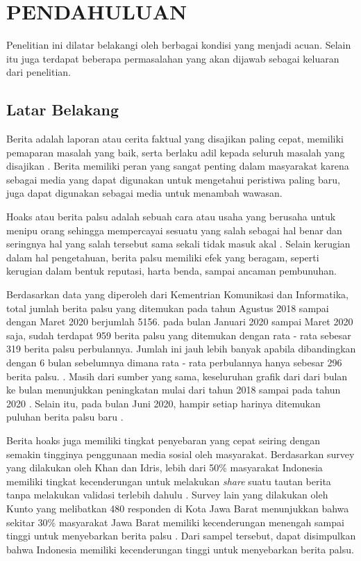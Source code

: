 \chapter{PENDAHULUAN}
\label{chap:pendahuluan}


Penelitian ini dilatar belakangi oleh berbagai kondisi yang menjadi acuan. Selain itu juga terdapat beberapa permasalahan yang akan dijawab sebagai keluaran dari penelitian.

\section{Latar Belakang}
\label{sec:latarbelakang}

Berita adalah laporan atau cerita faktual yang disajikan paling cepat, memiliki pemaparan masalah yang baik, serta berlaku adil kepada seluruh masalah yang disajikan \cite{rani2013persepsi}. Berita memiliki peran yang sangat penting dalam masyarakat karena sebagai media yang dapat digunakan untuk mengetahui peristiwa paling baru, juga dapat digunakan sebagai media untuk menambah wawasan.

Hoaks atau berita palsu adalah sebuah cara atau usaha yang berusaha untuk menipu orang sehingga mempercayai sesuatu yang salah sebagai hal benar dan seringnya hal yang salah tersebut sama sekali tidak masuk akal \cite{berita_bohong}. Selain kerugian dalam hal pengetahuan, berita palsu memiliki efek yang beragam, seperti kerugian dalam bentuk reputasi, harta benda, sampai ancaman pembunuhan.

Berdasarkan data yang diperoleh dari Kementrian Komunikasi dan Informatika, total jumlah berita palsu yang ditemukan pada tahun Agustus 2018 sampai dengan Maret 2020 berjumlah 5156. pada bulan Januari 2020 sampai Maret 2020 saja, sudah terdapat 959 berita palsu yang ditemukan dengan rata - rata sebesar 319 berita palsu perbulannya. Jumlah ini jauh lebih banyak apabila dibandingkan dengan 6 bulan sebelumnya dimana rata - rata perbulannya hanya sebesar 296 berita palsu. \cite{kominfoStatHoax}. Masih dari sumber yang sama, keseluruhan grafik dari dari bulan ke bulan menunjukkan peningkatan mulai dari tahun 2018 sampai pada tahun 2020 \cite{kominfoStatHoax}. Selain itu, pada bulan Juni 2020, hampir setiap harinya ditemukan puluhan berita palsu baru \cite{kominfoJuni2020}.

Berita hoaks juga memiliki tingkat penyebaran yang cepat seiring dengan semakin tingginya penggunaan media sosial oleh masyarakat. Berdasarkan survey yang dilakukan oleh Khan dan Idris, lebih dari 50\% masyarakat Indonesia memiliki tingkat kecenderungan untuk melakukan \textit{share} suatu tautan berita tanpa melakukan validasi terlebih dahulu \cite{khan}. Survey lain yang dilakukan oleh Kunto yang melibatkan 480 responden di Kota Jawa Barat menunjukkan bahwa sekitar 30\% masyarakat Jawa Barat memiliki kecenderungan menengah sampai tinggi untuk menyebarkan berita palsu \cite{kuntoUmur}. Dari sampel tersebut, dapat disimpulkan bahwa Indonesia memiliki kecenderungan tinggi untuk menyebarkan berita palsu.


